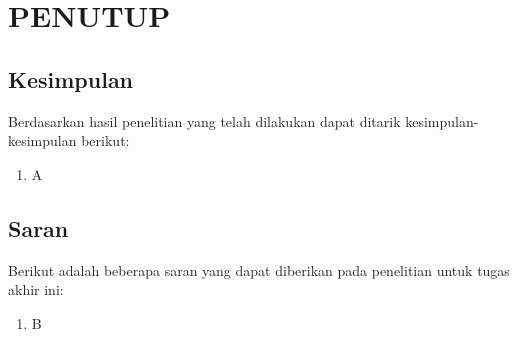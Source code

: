 \chapter{PENUTUP}
\label{chap:penutup}


\section{Kesimpulan}
\label{sec:kesimpulan}

Berdasarkan hasil penelitian yang telah dilakukan dapat ditarik kesimpulan-kesimpulan berikut:

\begin{enumerate}[nolistsep]
	
\item A

\end{enumerate}

\section{Saran}
\label{chap:saran}

Berikut adalah beberapa saran yang dapat diberikan pada penelitian untuk tugas akhir ini:

\begin{enumerate}[nolistsep]
	
\item B

\end{enumerate}
